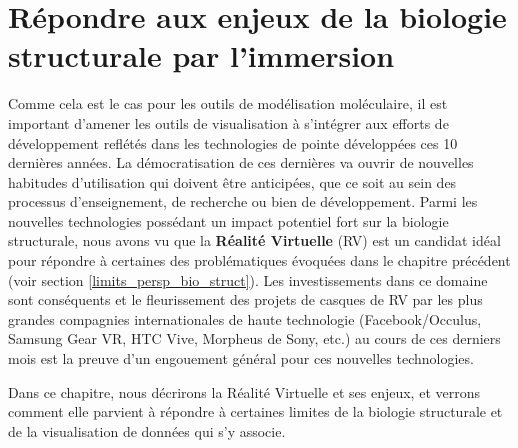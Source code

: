 
\chapter[Répondre aux enjeux de la biologie structurale par l'immersion]{Répondre aux enjeux de la biologie structurale par l'immersion}
\label{Sec:visuAna}
\minitoc
\cleardoublepage





Comme cela est le cas pour les outils de modélisation moléculaire, il est important d'amener les outils de visualisation à s'intégrer aux efforts de développement reflétés dans les technologies de pointe développées ces 10 dernières années. La démocratisation de ces dernières va ouvrir de nouvelles habitudes d'utilisation qui doivent être anticipées, que ce soit au sein des processus d'enseignement, de recherche ou bien de développement. Parmi les nouvelles technologies possédant un impact potentiel fort sur la biologie structurale, nous avons vu que la \textbf{Réalité Virtuelle} (RV) est un candidat idéal pour répondre à certaines des problématiques évoquées dans le chapitre précédent (voir section \ref{limits_persp_bio_struct}). Les investissements dans ce domaine sont conséquents et le fleurissement des projets de casques de RV par les plus grandes compagnies internationales de haute technologie (Facebook/Occulus, Samsung Gear VR, HTC Vive, Morpheus de Sony, etc.) au cours de ces derniers mois est la preuve d'un engouement général pour ces nouvelles technologies.

Dans ce chapitre, nous décrirons la Réalité Virtuelle et ses enjeux, et verrons comment elle parvient à répondre à certaines limites de la biologie structurale et de la visualisation de données qui s'y associe.

